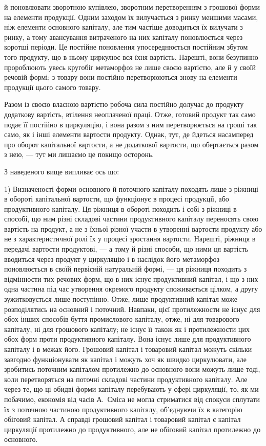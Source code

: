 \parcont{}  %
й поновлювати зворотною купівлею, зворотним перетворенням з грошової форми на елементи продукції.
Одним заходом їх вилучається з ринку меншими масами, ніж елементи основного капіталу, але тим
частіше доводиться їх вилучати з ринку, а тому авансування витраченого на них капіталу поновлюється
через коротші періоди. Це постійне поновлення упосереднюється постійним збутом того продукту, що в
ньому циркулює вся їхня вартість. Нарешті, вони безупинно пророблюють увесь кругобіг метаморфоз не
лише своєю вартістю, але й у своїй речовій формі; з товару вони постійно перетворюються знову на
елементи продукції цього самого товару.

Разом із своєю власною вартістю робоча сила постійно долучає до продукту додаткову вартість,
втілення неоплаченої праці. Отже, готовий продукт так само подає її постійно в циркуляцію, і вона
разом з ним перетворюється на гроші так само, як і інші елементи вартости продукту. Однак, тут, де
йдеться насамперед про оборот капітальної вартости, а не додаткової вартости, що обертається разом з
нею, — тут ми лишаємо це покищо осторонь.

З наведеного вище випливає ось що:

1) Визначеності форми основного й поточного капіталу походять лише з ріжниці в обороті капітальної
вартости, що функціонує в процесі продукції, або продуктивного капіталу. Ця ріжниця в обороті
походить і собі з ріжниці в способі, що ним різні складові частини продуктивного капіталу переносять
свою вартість на продукт, а не з їхньої різної участи в утворенні вартости продукту або не з
характеристичної ролі їх у процесі зростання вартости. Нарешті, ріжниця в передачі вартости
продуктові, — а тому й різні способи, що ними ця вартість вводиться через продукт у циркуляцію і в
наслідок його метаморфоз поновлюється в своїй первісній натуральній формі, — ця ріжниця походить з
відмінности тих речових форм, що в них існує продуктивний капітал, і що з них одна частина під час
утворення окремого продукту споживається цілком, а другу зужитковується лише поступінно. Отже, лише
продуктивний капітал може розподілятись на основний і поточний. Навпаки, цієї протилежности не існує
для обох інших способів буття промислового капіталу, отже, ні для товарового капіталу, ні для
грошового капіталу; не існує її також як і протилежности цих обох форм проти продуктивного капіталу.
Вона існує лише для продуктивного капіталу і в межах його. Грошовий капітал і товаровий капітал
можуть скільки завгодно функціонувати як капітал і можуть хоч як швидко циркулювати, але зробитись
поточним капіталом протилежно до основного вони можуть лише тоді, коли перетворяться на поточні
складові частини продуктивного капіталу. Але через те, що ці обидві форми капіталу перебувають у
сфері циркуляції, то, як ми побачимо, економія від часів А.~Сміса не могла стриматися від спокуси
сплутати їх з поточною частиною продуктивного капіталу, об’єднуючи їх в категорію обіговий капітал.
А справді грошовий капітал і товаровий капітал є капітал циркуляції протилежно до продуктивного, але
не обіговий капітал протилежно до основного.
